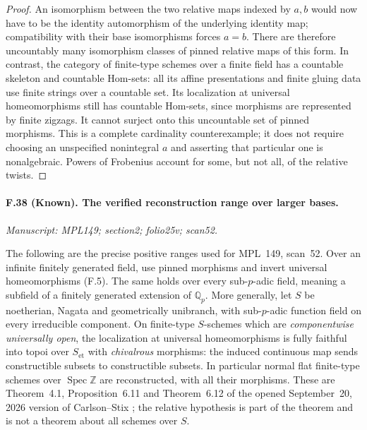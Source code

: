 \begin{proof}
An isomorphism between the two relative maps indexed by $a,b$ would now
have to be the identity automorphism of the underlying identity map;
compatibility with their base isomorphisms forces $a=b$. There are
therefore uncountably many isomorphism classes of pinned relative maps
of this form. In contrast, the category of finite-type schemes over a
finite field has a countable skeleton and countable Hom-sets: all its
affine presentations and finite gluing data use finite strings over a
countable set. Its localization at universal homeomorphisms still has
countable Hom-sets, since morphisms are represented by finite zigzags.
It cannot surject onto this uncountable set of pinned morphisms.
This is a complete cardinality counterexample; it does not require
choosing an unspecified nonintegral $a$ and asserting that particular
one is nonalgebraic. Powers of Frobenius account for some, but not all,
of the relative twists.
\end{proof}

\paragraph{F.38 (Known). The verified reconstruction range over larger bases.}
\textit{Manuscript: MPL149; section2; folio25v; scan52.}

The following are the precise positive ranges used for MPL~149,
scan~52. Over an infinite finitely generated field, use pinned morphisms
and invert universal homeomorphisms (F.5). The same holds over every
sub-$p$-adic field, meaning a subfield of a finitely generated extension
of $\mathbb Q_p$. More generally, let $S$ be noetherian, Nagata and
geometrically unibranch, with sub-$p$-adic function field on every
irreducible component. On finite-type $S$-schemes which are
\emph{componentwise universally open}, the localization at universal
homeomorphisms is fully faithful into topoi over $S_{\mathrm{et}}$ with
\emph{chivalrous} morphisms: the induced continuous map sends
constructible subsets to constructible subsets. In particular normal
flat finite-type schemes over $\operatorname{Spec}\mathbb Z$ are
reconstructed, with all their morphisms. These are Theorem~4.1,
Proposition~6.11 and Theorem~6.12 of the opened September~20, 2026 version
of Carlson--Stix \citep{CarlsonStix2026}; the relative hypothesis is part
of the theorem and is not a theorem about all schemes over $S$.

